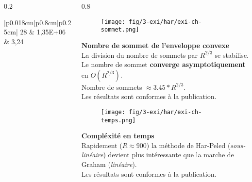 \begin{frame}
\begin{columns}[t]
\begin{column}{0.2\linewidth}
\begin{tiny}
\begin{table}[H]
\begin{tabular}{|p{0.018cm}|p{0.8cm}|p{0.25cm}|}
          28 & 1,35E+06  & 3,24\\
          \hline
        \end{tabular} 
        \label{tab:ch} 
      \end{table}
    \end{tiny}
  \end{column}
  \begin{column}{0.8\linewidth}
    \vspace{-0.6cm}
    {
      \begin{figure}[H]
        \centering
        \texttt{[image: fig/3-exi/har/exi-ch-sommet.png]}       
      \end{figure}
      \vspace{-0.3cm}
      \begin{exampleblock}{}
       \textbf{Nombre de sommet de l'enveloppe convexe}\\
        La division du nombre de sommets par $R^{2/3}$ se stabilise.\\
        Le nombre de sommet \textbf{converge asymptotiquement} en $O(R^{2/3})$. \\
        Nombre de sommets $ \approx 3.45 * R^{2/3}$.\\
        Les résultats sont conformes à la publication. \\

     \end{exampleblock}
    }
    
    {
      \begin{figure}[H]
        \centering
        \texttt{[image: fig/3-exi/har/exi-ch-temps.png]}
      \end{figure}
      \vspace{-0.3cm}
      \begin{exampleblock}{}
        \textbf{Compléxité en temps}\\
        Rapidement  ($R \approx 900$) la méthode de Har-Peled (\textit{sous-linéaire}) devient plus intéressante que la marche de Graham (\textit{linéaire}).\\
        Les résultats sont conformes à la publication.
      \end{exampleblock}
    }
       
  \end{column}  
\end{columns}
\end{frame}
